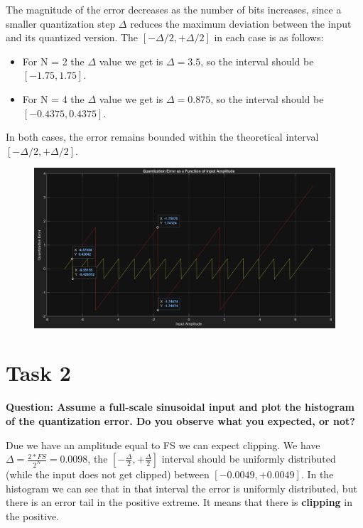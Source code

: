 \documentclass[11pt,a4paper]{article}
\begin{document}
\vspace{0.5cm}
The magnitude of the error decreases as the number of bits increases, since a smaller quantization step
$\Delta$ reduces the maximum deviation between the input and its quantized version.
The $[-\Delta /2, +\Delta /2]$ in each case is as follows:
\begin{itemize}
    \item For N = 2 the $\Delta$ value we get is $\Delta = 3.5$, so the interval should be $[-1.75, 1.75]$.
    \item For N = 4 the $\Delta$ value we get is $\Delta = 0.875$, so the interval should be $[-0.4375, 0.4375]$.
\end{itemize}
In both cases, the error remains bounded within the theoretical interval $[-\Delta /2, +\Delta /2]$.

\begin{figure}
    \centering
    \includegraphics[width=1\textwidth]{img/task1_2_2.png}
    \label{fig:task1_2_2}
\end{figure}

\section{Task 2}
\textbf{Question: Assume a full-scale sinusoidal input and plot the histogram of the quantization error. Do you observe what you expected, or not?}

\vspace{0.5cm}
Due we have an amplitude equal to FS we can expect clipping. We have $\Delta= \frac{2*FS}{2^N} = 0.0098$, the $[-\frac{\Delta}{2}, +\frac{\Delta}{2}]$ interval should be uniformly distributed (while the input does not get clipped) between $[-0.0049, +0.0049]$.
In the histogram we can see that in that interval the error is uniformly distributed, but there is an error tail in the positive extreme.
It means that there is \textbf{clipping} in the positive.
\end{document}
